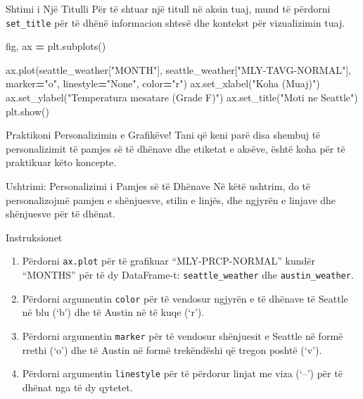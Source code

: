 \documentclass[
  ignorenonframetext,
]{beamer}
\newenvironment{Shaded}{\begin{snugshade}}{\end{snugshade}}
\newcommand{\NormalTok}[1]{#1}
\newcommand{\OperatorTok}[1]{\textcolor[rgb]{0.81,0.36,0.00}{\textbf{#1}}}
\newcommand{\StringTok}[1]{\textcolor[rgb]{0.31,0.60,0.02}{#1}}
\begin{document}
\begin{frame}[fragile]{Shtimi i Një Titulli}
\protect\hypertarget{shtimi-i-njuxeb-titulli}{}
Për të shtuar një titull në aksin tuaj, mund të përdorni
\texttt{set\_title} për të dhënë informacion shtesë dhe kontekst për
vizualizimin tuaj.


\begin{Shaded}
\begin{Highlighting}[]
\NormalTok{fig, ax }\OperatorTok{=}\NormalTok{ plt.subplots()}

\NormalTok{ax.plot(seattle\_weather[}\StringTok{"MONTH"}\NormalTok{], seattle\_weather[}\StringTok{"MLY{-}TAVG{-}NORMAL"}\NormalTok{],}
\NormalTok{marker}\OperatorTok{=}\StringTok{"o"}\NormalTok{, linestyle}\OperatorTok{=}\StringTok{"None"}\NormalTok{, color}\OperatorTok{=}\StringTok{"r"}\NormalTok{)}
\NormalTok{ax.set\_xlabel(}\StringTok{"Koha (Muaj)"}\NormalTok{)}
\NormalTok{ax.set\_ylabel(}\StringTok{"Temperatura mesatare (Grade F)"}\NormalTok{)}
\NormalTok{ax.set\_title(}\StringTok{"Moti ne Seattle"}\NormalTok{)}
\NormalTok{plt.show()}
\end{Highlighting}
\end{Shaded}
\end{frame}

\begin{frame}{Praktikoni Personalizimin e Grafikëve!}
\protect\hypertarget{praktikoni-personalizimin-e-grafikuxebve}{}
Tani që keni parë disa shembuj të personalizimit të pamjes së të dhënave
dhe etiketat e aksëve, është koha për të praktikuar këto koncepte.
\end{frame}

\begin{frame}{Ushtrimi: Personalizimi i Pamjes së të Dhënave}
\protect\hypertarget{ushtrimi-personalizimi-i-pamjes-suxeb-tuxeb-dhuxebnave}{}
Në këtë ushtrim, do të personalizojmë pamjen e shënjuesve, stilin e
linjës, dhe ngjyrën e linjave dhe shënjuesve për të dhënat.
\end{frame}

\begin{frame}[fragile]{Instruksionet}
\protect\hypertarget{instruksionet-2}{}
\begin{enumerate}
\item
  Përdorni \texttt{ax.plot} për të grafikuar ``MLY-PRCP-NORMAL'' kundër
  ``MONTHS'' për të dy DataFrame-t: \texttt{seattle\_weather} dhe
  \texttt{austin\_weather}.
\item
  Përdorni argumentin \texttt{color} për të vendosur ngjyrën e të
  dhënave të Seattle në blu (`b') dhe të Austin në të kuqe (`r').
\item
  Përdorni argumentin \texttt{marker} për të vendosur shënjuesit e
  Seattle në formë rrethi (`o') dhe të Austin në formë trekëndëshi që
  tregon poshtë (`v').
\item
  Përdorni argumentin \texttt{linestyle} për të përdorur linjat me viza
  (`--') për të dhënat nga të dy qytetet.
\end{enumerate}
\end{frame}
\end{document}
